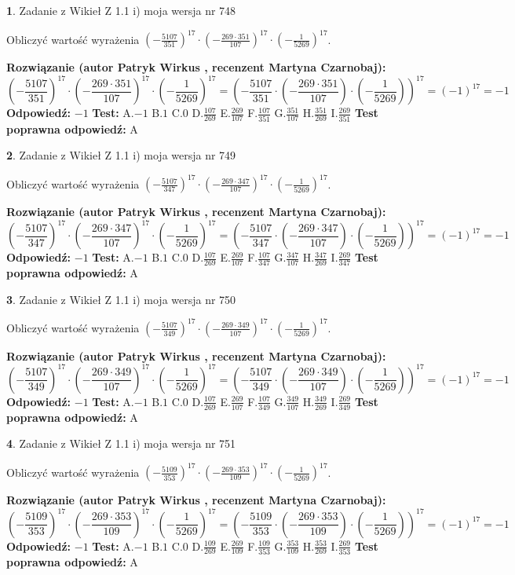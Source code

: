 \documentclass[12pt, a4paper]{article}
\theoremstyle{definition} %
\newtheorem{zad}{}
\newcommand{\zadStart}[1]{\begin{zad}#1\newline}
\newcommand{\zadStop}{\end{zad}}
\newcommand{\rozwStart}[2]{\noindent \textbf{Rozwiązanie (autor #1 , recenzent #2): }\newline}
\newcommand{\rozwStop}{\newline}
\newcommand{\odpStart}{\noindent \textbf{Odpowiedź:}\newline}
\newcommand{\odpStop}{\newline}
\newcommand{\testStart}{\noindent \textbf{Test:}\newline}
\newcommand{\testStop}{\newline}
\newcommand{\kluczStart}{\noindent \textbf{Test poprawna odpowiedź:}\newline}
\newcommand{\kluczStop}{\newline}
\begin{document}
\zadStart{Zadanie z Wikieł Z 1.1 i) moja wersja nr 748}

Obliczyć wartość wyrażenia $(-\frac{5107}{351})^{17} \cdot (-\frac{269 \cdot 351}{107})^{17} \cdot (-\frac{1}{5269})^{17}$.
\zadStop
\rozwStart{Patryk Wirkus}{Martyna Czarnobaj}
$$(-\frac{5107}{351})^{17} \cdot (-\frac{269 \cdot 351}{107})^{17} \cdot (-\frac{1}{5269})^{17} = (-\frac{5107}{351} \cdot (-\frac{269 \cdot 351}{107}) \cdot (-\frac{1}{5269}))^{17} = (-1)^{17} = -1$$
\rozwStop
\odpStart
$-1$
\odpStop
\testStart
A.$-1$ B.$1$ C.$0$ D.$\frac{107}{269}$ E.$\frac{269}{107}$
F.$\frac{107}{351}$ G.$\frac{351}{107}$
H.$\frac{351}{269}$
I.$\frac{269}{351}$
\testStop
\kluczStart
A
\kluczStop



\zadStart{Zadanie z Wikieł Z 1.1 i) moja wersja nr 749}

Obliczyć wartość wyrażenia $(-\frac{5107}{347})^{17} \cdot (-\frac{269 \cdot 347}{107})^{17} \cdot (-\frac{1}{5269})^{17}$.
\zadStop
\rozwStart{Patryk Wirkus}{Martyna Czarnobaj}
$$(-\frac{5107}{347})^{17} \cdot (-\frac{269 \cdot 347}{107})^{17} \cdot (-\frac{1}{5269})^{17} = (-\frac{5107}{347} \cdot (-\frac{269 \cdot 347}{107}) \cdot (-\frac{1}{5269}))^{17} = (-1)^{17} = -1$$
\rozwStop
\odpStart
$-1$
\odpStop
\testStart
A.$-1$ B.$1$ C.$0$ D.$\frac{107}{269}$ E.$\frac{269}{107}$
F.$\frac{107}{347}$ G.$\frac{347}{107}$
H.$\frac{347}{269}$
I.$\frac{269}{347}$
\testStop
\kluczStart
A
\kluczStop



\zadStart{Zadanie z Wikieł Z 1.1 i) moja wersja nr 750}

Obliczyć wartość wyrażenia $(-\frac{5107}{349})^{17} \cdot (-\frac{269 \cdot 349}{107})^{17} \cdot (-\frac{1}{5269})^{17}$.
\zadStop
\rozwStart{Patryk Wirkus}{Martyna Czarnobaj}
$$(-\frac{5107}{349})^{17} \cdot (-\frac{269 \cdot 349}{107})^{17} \cdot (-\frac{1}{5269})^{17} = (-\frac{5107}{349} \cdot (-\frac{269 \cdot 349}{107}) \cdot (-\frac{1}{5269}))^{17} = (-1)^{17} = -1$$
\rozwStop
\odpStart
$-1$
\odpStop
\testStart
A.$-1$ B.$1$ C.$0$ D.$\frac{107}{269}$ E.$\frac{269}{107}$
F.$\frac{107}{349}$ G.$\frac{349}{107}$
H.$\frac{349}{269}$
I.$\frac{269}{349}$
\testStop
\kluczStart
A
\kluczStop



\zadStart{Zadanie z Wikieł Z 1.1 i) moja wersja nr 751}

Obliczyć wartość wyrażenia $(-\frac{5109}{353})^{17} \cdot (-\frac{269 \cdot 353}{109})^{17} \cdot (-\frac{1}{5269})^{17}$.
\zadStop
\rozwStart{Patryk Wirkus}{Martyna Czarnobaj}
$$(-\frac{5109}{353})^{17} \cdot (-\frac{269 \cdot 353}{109})^{17} \cdot (-\frac{1}{5269})^{17} = (-\frac{5109}{353} \cdot (-\frac{269 \cdot 353}{109}) \cdot (-\frac{1}{5269}))^{17} = (-1)^{17} = -1$$
\rozwStop
\odpStart
$-1$
\odpStop
\testStart
A.$-1$ B.$1$ C.$0$ D.$\frac{109}{269}$ E.$\frac{269}{109}$
F.$\frac{109}{353}$ G.$\frac{353}{109}$
H.$\frac{353}{269}$
I.$\frac{269}{353}$
\testStop
\kluczStart
A
\kluczStop
\end{document}

